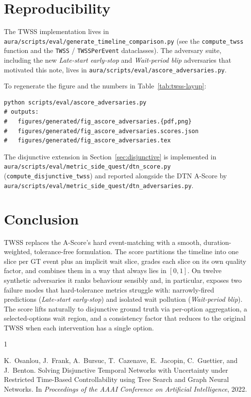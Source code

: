 \documentclass[11pt]{article}
\begin{document}
\section{Reproducibility}
\label{sec:repro}

The TWSS implementation lives in
\texttt{aura/scripts/eval/generate\_timeline\_comparison.py} (see the
\texttt{compute\_twss} function and the \texttt{TWSS} /
\texttt{TWSSPerEvent} dataclasses). The adversary suite, including
the new \emph{Late-start early-stop} and \emph{Wait-period blip}
adversaries that motivated this note, lives in
\texttt{aura/scripts/eval/ascore\_adversaries.py}.

\noindent
To regenerate the figure and the numbers in
Table~\ref{tab:twss-layup}:
\begin{lstlisting}
python scripts/eval/ascore_adversaries.py
# outputs:
#   figures/generated/fig_ascore_adversaries.{pdf,png}
#   figures/generated/fig_ascore_adversaries.scores.json
#   figures/generated/fig_ascore_adversaries.tex
\end{lstlisting}

The disjunctive extension in Section~\ref{sec:disjunctive} is
implemented in
\texttt{aura/scripts/eval/metric\_side\_quest/dtn\_score.py}
(\texttt{compute\_disjunctive\_twss}) and reported alongside the
DTN A-Score by
\texttt{aura/scripts/eval/metric\_side\_quest/dtn\_adversaries.py}.

\section{Conclusion}

TWSS replaces the A-Score's hard event-matching with a smooth,
duration-weighted, tolerance-free formulation. The score partitions
the timeline into one slice per GT event plus an implicit wait
slice, grades each slice on its own quality factor, and combines
them in a way that always lies in $[0, 1]$. On twelve synthetic
adversaries it ranks behaviour sensibly and, in particular, exposes
two failure modes that hard-tolerance metrics struggle with:
narrowly-fired predictions (\emph{Late-start early-stop}) and
isolated wait pollution (\emph{Wait-period blip}). The score lifts
naturally to disjunctive ground truth via per-option aggregation, a
selected-options wait region, and a consistency factor that reduces
to the original TWSS when each intervention has a single option.

\begin{thebibliography}{1}

K.~Osanlou, J.~Frank, A.~Bursuc, T.~Cazenave, E.~Jacopin, C.~Guettier,
and J.~Benton.
\newblock Solving Disjunctive Temporal Networks with Uncertainty under
Restricted Time-Based Controllability using Tree Search and Graph
Neural Networks.
\newblock In \emph{Proceedings of the AAAI Conference on Artificial
Intelligence}, 2022.

\end{thebibliography}
\end{document}
